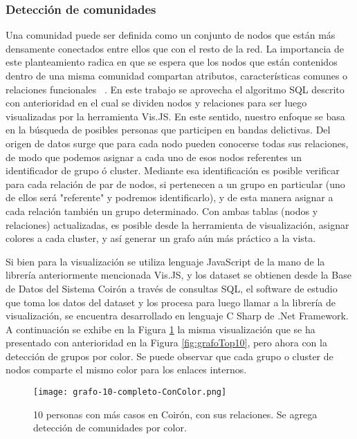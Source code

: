 
\subsubsection{Detección de comunidades}
Una comunidad puede ser definida como un conjunto de nodos que están más densamente conectados entre ellos que con el resto de la red. La importancia de este planteamiento radica en que se espera que los nodos que están contenidos dentro de una misma comunidad compartan atributos, características comunes o relaciones funcionales  ~\cite{ma2014exploring}.
En este trabajo se aprovecha el algoritmo SQL descrito con anterioridad en el cual se dividen nodos y relaciones para ser luego visualizadas por la herramienta Vis.JS.
En este sentido, nuestro enfoque se basa en la búsqueda de posibles personas que participen en bandas delictivas. Del origen de datos surge que para cada nodo pueden conocerse todas sus relaciones, de modo que podemos asignar a cada uno de esos nodos referentes un identificador de grupo ó cluster. Mediante esa identificación es posible verificar para cada relación de par de nodos, si pertenecen a un grupo en particular (uno de ellos será "referente" y podremos identificarlo), y de esta manera asignar a cada relación también un grupo determinado. Con ambas tablas (nodos y relaciones) actualizadas, es posible desde la herramienta de visualización, asignar colores a cada cluster, y así generar un grafo aún más práctico a la vista.

Si bien para la visualización se utiliza lenguaje JavaScript de la mano de la librería anteriormente mencionada Vis.JS, y los dataset se obtienen desde la Base de Datos del Sistema Coirón a través de consultas SQL, el software de estudio que toma los datos del dataset y los procesa para luego llamar a la librería de visualización, se encuentra desarrollado en lenguaje C Sharp de .Net Framework. 
A continuación se exhibe en la Figura \ref{fig:grafo-10-completo-ConColor} la misma visualización que se ha presentado con anterioridad en la Figura \ref{fig:grafoTop10}, pero ahora con la detección de grupos por color. Se puede observar que cada grupo o cluster de nodos comparte el mismo color para los enlaces internos. 
\vspace{-10pt}
\begin{figure}
	\centering
	\texttt{[image: grafo-10-completo-ConColor.png]}
	\caption{10 personas con más casos en Coirón, con sus relaciones. Se agrega detección de comunidades por color.} 
	\label{fig:grafo-10-completo-ConColor}
\end{figure}
